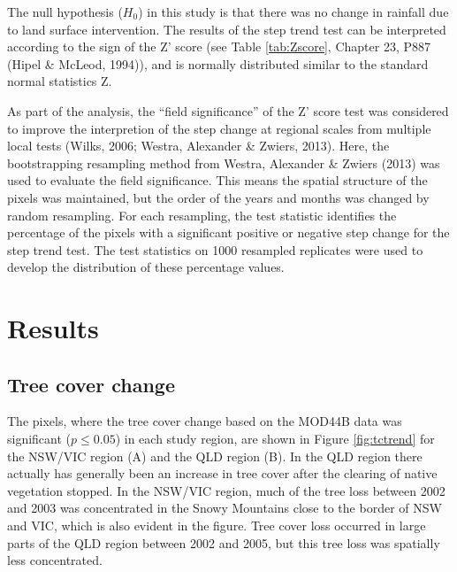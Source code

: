 \documentclass[fleqn,10pt,lineno]{wlpeerj} %
\theoremstyle{definition}
\theoremstyle{definition}
\theoremstyle{definition}
\theoremstyle{remark}
\begin{document}
The null hypothesis (\(H_0\)) in this study is that there was no change
in rainfall due to land surface intervention. The results of the step
trend test can be interpreted according to the sign of the Z' score (see
Table \ref{tab:Zscore}, Chapter 23, P887 (Hipel \& McLeod, 1994)), and
is normally distributed similar to the standard normal statistics Z.

As part of the analysis, the ``field significance'' of the Z' score test
was considered to improve the interpretion of the step change at
regional scales from multiple local tests (Wilks, 2006; Westra,
Alexander \& Zwiers, 2013). Here, the bootstrapping resampling method
from Westra, Alexander \& Zwiers (2013) was used to evaluate the field
significance. This means the spatial structure of the pixels was
maintained, but the order of the years and months was changed by random
resampling. For each resampling, the test statistic identifies the
percentage of the pixels with a significant positive or negative step
change for the step trend test. The test statistics on 1000 resampled
replicates were used to develop the distribution of these percentage
values.

\section{Results}\label{results}

\subsection{Tree cover change}\label{tree-cover-change}

The pixels, where the tree cover change based on the MOD44B data was
significant (\(p \leq 0.05\)) in each study region, are shown in Figure
\ref{fig:tctrend} for the NSW/VIC region (A) and the QLD region (B). In
the QLD region there actually has generally been an increase in tree
cover after the clearing of native vegetation stopped. In the NSW/VIC
region, much of the tree loss between 2002 and 2003 was concentrated in
the Snowy Mountains close to the border of NSW and VIC, which is also
evident in the figure. Tree cover loss occurred in large parts of the
QLD region between 2002 and 2005, but this tree loss was spatially less
concentrated.
\end{document}
